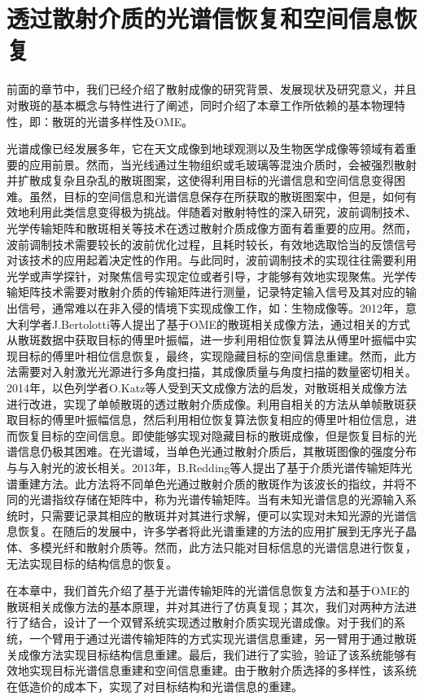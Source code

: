 
\chapter{透过散射介质的光谱信恢复和空间信息恢复}
前面的章节中，我们已经介绍了散射成像的研究背景、发展现状及研究意义，并且对散斑的基本概念与特性进行了阐述，同时介绍了本章工作所依赖的基本物理特性，即：散斑的光谱多样性及OME。

光谱成像已经发展多年，它在天文成像到地球观测以及生物医学成像等领域有着重要的应用前景。然而，当光线通过生物组织或毛玻璃等混浊介质时，会被强烈散射并扩散成复杂且杂乱的散斑图案，这使得利用目标的光谱信息和空间信息变得困难。虽然，目标的空间信息和光谱信息保存在所获取的散斑图案中，但是，如何有效地利用此类信息变得极为挑战。伴随着对散射特性的深入研究，波前调制技术、光学传输矩阵和散斑相关等技术在透过散射介质成像方面有着重要的应用。然而，波前调制技术需要较长的波前优化过程，且耗时较长，有效地选取恰当的反馈信号对该技术的应用起着决定性的作用。与此同时，波前调制技术的实现往往需要利用光学或声学探针，对聚焦信号实现定位或者引导，才能够有效地实现聚焦。光学传输矩阵技术需要对散射介质的传输矩阵进行测量，记录特定输入信号及其对应的输出信号，通常难以在非入侵的情境下实现成像工作，如：生物成像等。2012年，意大利学者J.Bertolotti等人\cite{bertolotti_non-invasive_2012}提出了基于OME\cite{Freund1988,Yllmaz2019}的散斑相关成像方法，通过相关的方式从散斑数据中获取目标的傅里叶振幅，进一步利用相位恢复算法从傅里叶振幅中实现目标的傅里叶相位信息恢复，最终，实现隐藏目标的空间信息重建。然而，此方法需要对入射激光光源进行多角度扫描，其成像质量与角度扫描的数量密切相关。2014年，以色列学者O.Katz等人\cite{katz_non-invasive_2014}受到天文成像方法的启发，对散斑相关成像方法进行改进，实现了单帧散斑的透过散射介质成像。利用自相关的方法从单帧散斑获取目标的傅里叶振幅信息，然后利用相位恢复算法恢复相应的傅里叶相位信息，进而恢复目标的空间信息。即使能够实现对隐藏目标的散斑成像，但是恢复目标的光谱信息仍极其困难。在光谱域，当单色光通过散射介质后，其散斑图像的强度分布与与入射光的波长相关。2013年，B.Redding等人提出了基于介质光谱传输矩阵光谱重建方法。此方法将不同单色光通过散射介质的散斑作为该波长的指纹，并将不同的光谱指纹存储在矩阵中，称为光谱传输矩阵。当有未知光谱信息的光源输入系统时，只需要记录其相应的散斑并对其进行求解，便可以实现对未知光源的光谱信息恢复。在随后的发展中，许多学者将此光谱重建的方法的应用扩展到无序光子晶体、多模光纤和散射介质等。然而，此方法只能对目标信息的光谱信息进行恢复，无法实现目标的结构信息的恢复。

在本章中，我们首先介绍了基于光谱传输矩阵的光谱信息恢复方法和基于OME的散斑相关成像方法的基本原理，并对其进行了仿真复现；其次，我们对两种方法进行了结合，设计了一个双臂系统实现透过散射介质实现光谱成像。对于我们的系统，一个臂用于通过光谱传输矩阵的方式实现光谱信息重建，另一臂用于通过散斑关成像方法实现目标结构信息重建。最后，我们进行了实验，验证了该系统能够有效地实现目标光谱信息重建和空间信息重建。由于散射介质选择的多样性，该系统在低造价的成本下，实现了对目标结构和光谱信息的重建。

